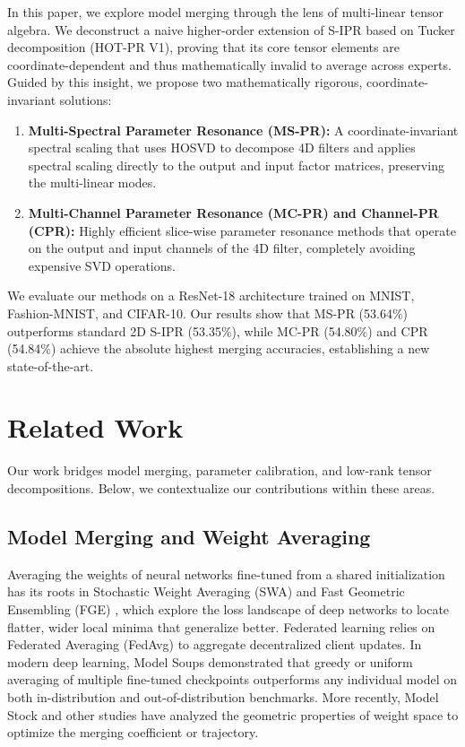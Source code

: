\documentclass{article}
\theoremstyle{plain}
\theoremstyle{definition}
\theoremstyle{remark}
\begin{document}
In this paper, we explore model merging through the lens of multi-linear tensor algebra. We deconstruct a naive higher-order extension of S-IPR based on Tucker decomposition (HOT-PR V1), proving that its core tensor elements are coordinate-dependent and thus mathematically invalid to average across experts. Guided by this insight, we propose two mathematically rigorous, coordinate-invariant solutions:
\begin{enumerate}
    \item \textbf{Multi-Spectral Parameter Resonance (MS-PR):} A coordinate-invariant spectral scaling that uses HOSVD to decompose 4D filters and applies spectral scaling directly to the output and input factor matrices, preserving the multi-linear modes.
    \item \textbf{Multi-Channel Parameter Resonance (MC-PR) and Channel-PR (CPR):} Highly efficient slice-wise parameter resonance methods that operate on the output and input channels of the 4D filter, completely avoiding expensive SVD operations.
\end{enumerate}

We evaluate our methods on a ResNet-18 architecture \cite{he2016deep} trained on MNIST, Fashion-MNIST, and CIFAR-10. Our results show that MS-PR (53.64\%) outperforms standard 2D S-IPR (53.35\%), while MC-PR (54.80\%) and CPR (54.84\%) achieve the absolute highest merging accuracies, establishing a new state-of-the-art.

\section{Related Work}
Our work bridges model merging, parameter calibration, and low-rank tensor decompositions. Below, we contextualize our contributions within these areas.

\subsection{Model Merging and Weight Averaging}
Averaging the weights of neural networks fine-tuned from a shared initialization has its roots in Stochastic Weight Averaging (SWA) \cite{izmailov2018averaging} and Fast Geometric Ensembling (FGE) \cite{garipov2018loss}, which explore the loss landscape of deep networks to locate flatter, wider local minima that generalize better. Federated learning relies on Federated Averaging (FedAvg) \cite{mcmahan2017communication} to aggregate decentralized client updates. In modern deep learning, Model Soups \cite{wortsman2022model} demonstrated that greedy or uniform averaging of multiple fine-tuned checkpoints outperforms any individual model on both in-distribution and out-of-distribution benchmarks. More recently, Model Stock \cite{kim2024model} and other studies \cite{choi2024revisiting, wang2024rethinking, micheli2024on} have analyzed the geometric properties of weight space to optimize the merging coefficient or trajectory.
\end{document}
